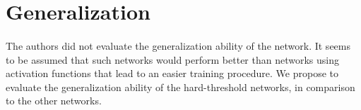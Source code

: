 \section{Generalization}\label{generalization}
\paragraph{}
The authors did not evaluate the generalization ability of the network. It seems to be assumed that such networks would perform better than networks using activation functions that lead to an easier training procedure. We propose to evaluate the generalization ability of the hard-threshold networks, in comparison to the other networks.